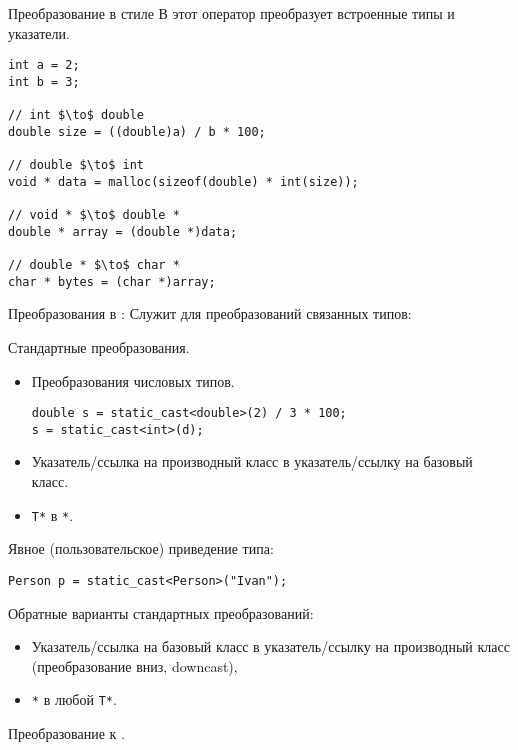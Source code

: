 \documentclass{beamer}
\begin{document}
\begin{frame}[fragile]{Преобразование в стиле \langc}{}
В \langc этот оператор преобразует встроенные типы и указатели.
\begin{lstlisting}
int a = 2;
int b = 3;
    
// int $\to$ double
double size = ((double)a) / b * 100; 

// double $\to$ int
void * data = malloc(sizeof(double) * int(size));

// void * $\to$ double *
double * array = (double *)data; 

// double * $\to$ char *
char * bytes = (char *)array;
\end{lstlisting}
\end{frame}

\begin{frame}[fragile]{Преобразования в \langcpp: }
    Служит для преобразований связанных типов:
    \begin{itemize}
        \pitem Стандартные преобразования.
        \begin{itemize}
\item Преобразования числовых типов.
\begin{lstlisting}
double s = static_cast<double>(2) / 3 * 100; 
s = static_cast<int>(d);
\end{lstlisting}
\item Указатель/ссылка на производный класс в указатель/ссылку на базовый класс.
\item \texttt{T*} в \texttt{*}.
        \end{itemize}
        \pitem Явное (пользовательское) приведение типа:
\begin{lstlisting}
Person p = static_cast<Person>("Ivan");
\end{lstlisting}
        \pitem Обратные варианты стандартных преобразований:
            \begin{itemize}
                \item Указатель/ссылка на базовый класс в указатель/ссылку на производный класс (преобразование вниз, downcast),
                \item {}\texttt{*} в любой {\tt T*}.                          
            \end{itemize}
        \pitem Преобразование к .
    \end{itemize}
\end{frame}
\end{document}

